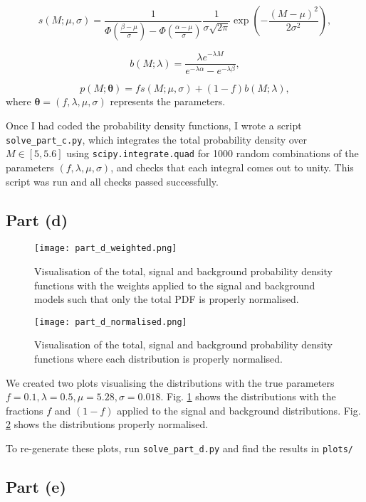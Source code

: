 \documentclass{article}
\begin{document}
$$
s(M; \mu, \sigma) = 
\frac{1}{\Phi(\frac{\beta-\mu}{\sigma}) - \Phi(\frac{\alpha-\mu}{\sigma})}
\frac{1}{\sigma\sqrt{2\pi}}
\exp\left(-\frac{(M - \mu)^2}{2\sigma^2}\right),
$$

$$
b(M; \lambda) = 
\frac{\lambda e^{-\lambda M}}
{e^{-\lambda\alpha} - e^{-\lambda\beta}},
$$

$$
p(M; \boldsymbol{\theta}) = fs(M; \mu, \sigma) + (1-f)b(M; \lambda),
$$
where $\boldsymbol{\theta} = (f, \lambda, \mu, \sigma)$ represents the parameters.

Once I had coded the probability density functions, I wrote a script \texttt{solve\_part\_c.py}, which integrates the total probability density over $M \in [5, 5.6]$ using \texttt{scipy.integrate.quad} for 1000 random combinations of the parameters $(f, \lambda, \mu, \sigma)$, and checks that each integral comes out to unity. This script was run and all checks passed successfully.

\subsection*{Part (d)}

\begin{figure}[h]
\centering
\texttt{[image: part\_d\_weighted.png]}
\caption{Visualisation of the total, signal and background probability density functions with the weights applied to the signal and background models such that only the total PDF is properly normalised.}
\label{fig:dWeighted}
\end{figure}

\begin{figure}[h]
\centering
\texttt{[image: part\_d\_normalised.png]}
\caption{Visualisation of the total, signal and background probability density functions where each distribution is properly normalised.}
\label{fig:dNorm}
\end{figure}

We created two plots visualising the distributions with the true parameters $f = 0.1, \lambda = 0.5, \mu = 5.28, \sigma = 0.018$. Fig. \ref{fig:dWeighted} shows the distributions with the fractions $f$ and $(1-f)$ applied to the signal and background distributions. Fig. \ref{fig:dNorm} shows the distributions properly normalised.  

To re-generate these plots, run \texttt{solve\_part\_d.py} and find the results in \texttt{plots/}

\subsection*{Part (e)}
\end{document}
